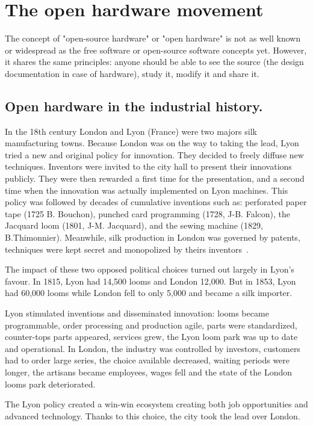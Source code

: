 \section{The open hardware movement} %

The concept of "open-source hardware" or "open hardware" is not as well known or widespread as the free software or open-source software concepts yet. However, it shares the same principles: anyone should be able to see the source (the design documentation in case of hardware), study it, modify it and share it.


\subsection{Open hardware in the industrial history.} %

In the 18th century London and Lyon (France) were two majors silk manufacturing towns. Because London was on the way to taking the lead, Lyon tried a new and original policy for innovation. They decided to freely diffuse new techniques. Inventors were invited to the city hall to present their innovations publicly. They were then rewarded a first time for the presentation, and a second time when the innovation was actually implemented on Lyon machines. This policy was followed by decades of cumulative inventions such as: perforated paper tape (1725 B. Bouchon), punched card programming (1728, J-B. Falcon), the Jacquard loom (1801, J-M. Jacquard), and the sewing machine (1829, B.Thimonnier). Meanwhile, silk production in London was governed by patents, techniques were kept secret and monopolized by theirs inventors~\parencite{alain1997fate}.

The impact of these two opposed political choices turned out largely in Lyon’s favour. In 1815, Lyon had 14,500 looms and London 12,000. But in 1853, Lyon had 60,000 looms while London fell to only 5,000 and became a silk importer.

Lyon stimulated inventions and disseminated innovation: looms became programmable, order processing and production agile, parts were standardized, counter-tops parts appeared, services grew, the Lyon loom park was up to date and operational.
In London, the industry was controlled by investors, customers had to order large series, the choice available decreased, waiting periods were longer, the artisans became employees, wages fell and the state of the London looms park deteriorated.

The Lyon policy created a win-win ecosystem creating both job opportunities and advanced technology. Thanks to this choice, the city took the lead over London.

